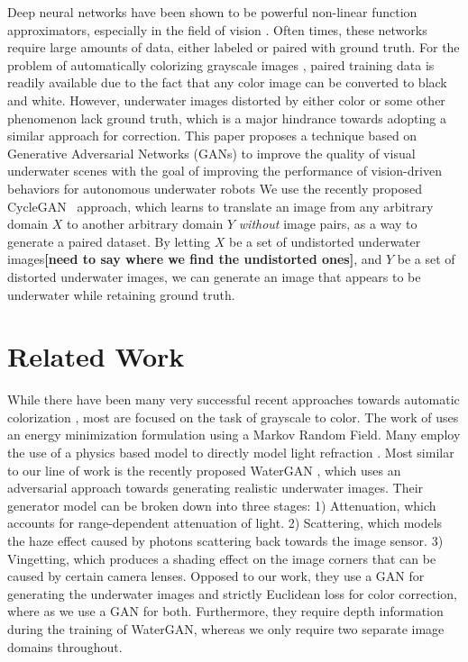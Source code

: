\documentclass[letterpaper, 10pt, conference]{ieeeconf}
\newcommand{\marginlabel}[1]{\mbox{}\marginpar[\raggedleft\hspace{0pt}{#1}]{
\raggedright\hspace{0pt}{#1}}}
\newcommand{\starnote}[1]{\marginlabel{$\bigstar$}\textbf{[#1]}}
\begin{document}
Deep neural networks have been shown to be powerful non-linear function approximators, especially in the field of vision \cite{krizhevsky2012imagenet}. Often times, these networks require large amounts of data, either labeled or paired with
ground truth. For the problem of automatically colorizing grayscale images \cite{zhang2016colorful}, paired training
data is
readily available due to the fact that any color image can be converted to black and white. However, underwater images distorted by either
color or some other phenomenon lack ground truth, which is a major hindrance towards adopting a similar approach for correction. This paper proposes a technique based on Generative Adversarial Networks (GANs) to improve the quality of visual underwater scenes with the goal of improving the performance of vision-driven behaviors for autonomous underwater robots
We use the recently proposed CycleGAN~\cite{zhu2017unpaired} approach, which learns to translate an image from any arbitrary domain $X$ to another arbitrary domain $Y$ \textit{without} image pairs, as a way to generate a paired dataset.
By letting $X$ be a set of undistorted underwater images\starnote{need to say where we find the undistorted ones}, and
$Y$ be a set of distorted underwater images, we can generate an image that appears to be underwater while retaining
ground truth.

\section{Related Work}

While there have been many very successful recent approaches towards automatic colorization
\cite{zhang2016colorful,iizuka2016let}, most are focused on the task of grayscale to color.
The work of \cite{torres2005color} uses an energy minimization formulation using a Markov Random Field. 
Many employ the use of a physics based model to directly model light refraction \cite{jordt2014underwater}.
Most similar to our line of work is the recently proposed WaterGAN \cite{li2017watergan}, which uses an adversarial
approach towards generating realistic underwater images. Their generator model can be broken down into three stages:
1) Attenuation, which accounts for range-dependent attenuation of light.
2) Scattering, which models the haze effect caused by photons scattering back towards the image sensor. 3)
Vingetting, which produces a shading effect on the image corners that can be caused by certain camera lenses.
Opposed to our work, they use a GAN for generating the underwater images and strictly Euclidean loss for color
correction, where as we use a GAN for both. Furthermore, they require depth information during the training of WaterGAN,
whereas we only require two separate image domains throughout.
\end{document}
